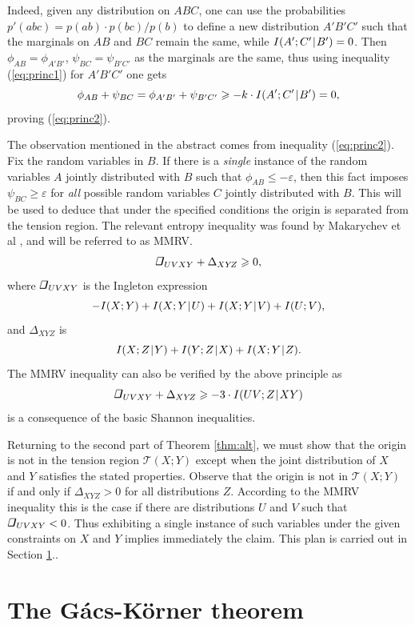\documentclass{IEEEtran}
\newcommand\eps{\varepsilon}
\newcommand\T{\mathcal{T}}
\newcommand\ing{\begin{tikzpicture}[scale=0.13\ht\strutbox]%
        \draw[line width=0.015cm](0,0)--(0.055,0.22)--(0.22,0.22);
        \draw[line width=0.035cm](0.22,0.22)--(0.165,0);
        \draw[line width=0.025cm](0.165,0)--(0,0);
   \end{tikzpicture}}
\newcommand\XYZ{{XY\!Z}}
\newcommand\I{I\xspace}
\def\|{\mkern 1.4mu\mathord{|}\mkern 1.4mu}
\renewcommand{\ge}{\geqslant}
\renewcommand{\le}{\leqslant}
\begin{document}
Indeed, given any distribution on $ABC$, one can use the probabilities
$p'(abc)=p(ab)\cdot p(bc)/p(b)$ to define a new distribution $A'B'C'$ such
that the marginals on $AB$ and $BC$ remain the same, while
$\I(A';C'\|B')=0$. Then $\phi_{AB}=\phi_{A'B'}$, $\psi_{BC}=\psi_{B'C'}$ as
the marginals are the same, thus using inequality (\ref{eq:princ1}) for
$A'B'C'$ one gets
$$
    \phi_{AB}+\psi_{BC}=\phi_{A'B'} + \psi_{B'C'}
     \ge -k\cdot\I(A';C'\|B') = 0,
$$
proving (\ref{eq:princ2}).

The observation mentioned in the abstract comes from inequality
(\ref{eq:princ2}). Fix the random variables in $B$. If there is a
\emph{single} instance of the random variables $A$ jointly distributed with
$B$ such that $\phi_{AB} \le -\eps$, then this fact imposes
$\psi_{BC}\ge\eps$ for \emph{all} possible random variables $C$ jointly
distributed with $B$. This will be used to deduce that under the specified
conditions the origin is separated from the tension region. The relevant
entropy inequality was found by Makarychev et al \cite{MMRV}, and will be
referred to as MMRV.
\begin{equation}\label{eq:MMRV}
  \ing_{UVXY}+\Delta_\XYZ\ge 0,
\end{equation}
where $\ing_{UVXY}$ is the Ingleton expression
$$
  -\I(X;Y)+\I(X;Y\|U)+\I(X;Y\|V)+\I(U;V),
$$
and $\Delta_\XYZ$ is
$$
 \I(X;Z\|Y)+\I(Y;Z\|X)+\I(X;Y\|Z).
$$
The MMRV inequality can also be verified by the above principle as
$$
  \ing_{UVXY}+\Delta_\XYZ \ge -3\cdot\I(UV;Z\|XY)
$$
is a consequence of the basic Shannon inequalities.

Returning to the second part of Theorem \ref{thm:alt}, we must show that the
origin is not in the tension region $\T(X;Y)$ except when the joint
distribution of $X$ and $Y$ satisfies the stated properties. Observe that
the origin is not in $\T(X;Y)$ if and only if $\Delta_\XYZ>0$ for all
distributions $Z$. According to the MMRV inequality this is the case if
there are distributions $U$ and $V$ such that $\ing_{UVXY}<0$. Thus
exhibiting a single instance of such variables under the given constraints
on $X$ and $Y$ implies immediately the claim. This plan is carried out in
Section \ref{sec:MMRV}..

\def\[{[\mskip -2mu[} \def\]{]\mskip -2mu]}
\def\cd{{\cdot}}

\section{The G\'acs-K\"orner theorem}\label{sec:MMRV}
\end{document}
